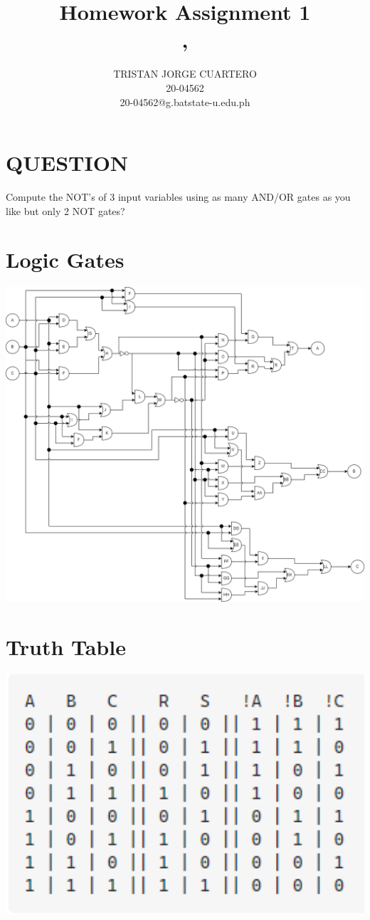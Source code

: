 \documentclass{article}
\title{
Homework Assignment 1 \hfill\\
\small
\coursecode, \coursename
}
\author{
TRISTAN JORGE CUARTERO \hfill\\
20-04562 \hfill\\
\small
20-04562@g.batstate-u.edu.ph
}
\begin{document}
\maketitle


\section{QUESTION}

Compute the NOT's of 3 input variables using as many AND/OR gates as you like but only 2 NOT gates?

\section{Logic Gates}
\begin{center}
\centering
\includegraphics[width=1\textwidth]{logic gates.png}
\end{center}

\section{Truth Table}
\begin{center}
\centering
\includegraphics[width=1\textwidth]{truth table.png}
\end{center}
\end{document}
